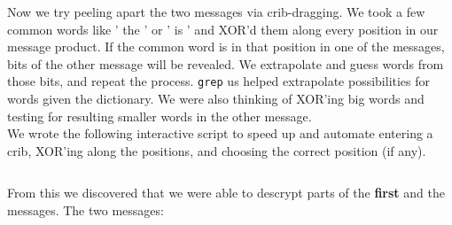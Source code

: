 \documentclass[11pt]{article}
\begin{document}
		Now we try peeling apart the two messages via crib-dragging. We took a few common words like ' the ' or ' is ' and XOR'd them along every position in our message product. If the common word is in that position in one of the messages, bits of the other message will be revealed. We extrapolate and guess words from those bits, and repeat the process. \texttt{grep} us helped extrapolate possibilities for words given the dictionary. We were also thinking of XOR'ing big words and testing for resulting smaller words in the other message.\\

We wrote the following interactive script to speed up and automate entering a crib, XOR'ing along the positions, and choosing the correct position (if any).
\inputminted{python}{2b.py}

From this we discovered that we were able to descrypt parts of the \textbf{first} and the  messages. The two messages:\\
\inputminted{python}{decrypted-message.txt}
\end{document}
